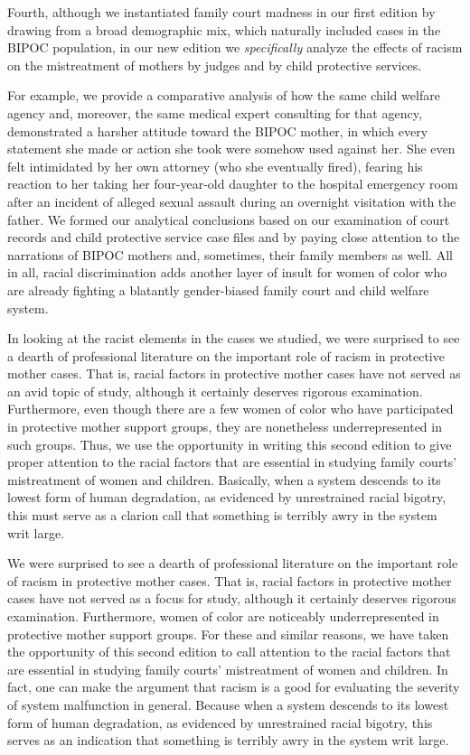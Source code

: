 Fourth, although we instantiated family court madness in our first
edition by drawing from a broad demographic mix, which naturally 
included cases in the BIPOC population, in our new edition we \textit{specifically}
analyze the effects of racism on the mistreatment of mothers by judges
and by child protective services. \pfl{}

For example, we provide a comparative analysis of how the same child
welfare agency and, moreover, the same medical expert consulting for
that agency, demonstrated a harsher attitude toward the BIPOC mother,
in which every statement she made or action she took were somehow
used against her. She even felt intimidated by her own attorney (who
she eventually fired), fearing his reaction to her taking her four-year-old
daughter to the hospital emergency room after an incident of alleged
sexual assault during an overnight visitation with the father. We formed
our analytical conclusions based on our examination of court records
and child protective service case files and by paying close attention to
the narrations of BIPOC mothers and, sometimes, their family members
as well. All in all, racial discrimination adds another layer of insult
for women of color who are already fighting a blatantly gender-biased
family court and child welfare system. \pfl{}

In looking at the racist elements in the cases we studied, we were 
surprised to see a dearth of professional literature 
on the important role of racism in protective mother cases. That is, racial factors in
protective mother cases have not served as an avid topic of study, although it certainly deserves rigorous examination. Furthermore, even
though there are a few women of color who have participated in protective mother support groups, they are nonetheless underrepresented
in such groups. Thus, we use the opportunity in writing this second
edition to give proper attention to the racial factors that are essential in studying family courts' mistreatment of women and children.
Basically, when a system descends to its lowest form of human degradation, as evidenced by unrestrained racial bigotry, this must serve
as a clarion call that something is terribly awry in the system writ
large. \pfl{}

We were surprised to see a dearth of professional literature on the 
important role of racism in protective mother cases. That is, racial factors
in protective mother cases have not served as a focus for study, 
although it certainly deserves rigorous examination. Furthermore, women
of color are noticeably underrepresented in protective mother support
groups. For these and similar reasons, we have taken the opportunity
of this second edition to call attention to the racial factors that are 
essential in studying family courts' mistreatment of women and children.
In fact, one can make the argument that racism is a good 
for evaluating the severity of system malfunction in general. Because
when a system descends to its lowest form of human degradation, as
evidenced by unrestrained racial bigotry, this serves as an indication
that something is terribly awry in the system writ large. \pfl{}

